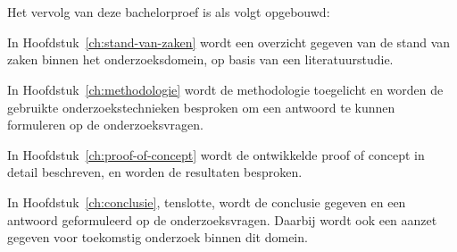 \section{}%
\label{sec:opzet-bachelorproef}


Het vervolg van deze bachelorproef is als volgt opgebouwd:

In Hoofdstuk~\ref{ch:stand-van-zaken} wordt een overzicht gegeven van de stand van zaken binnen het onderzoeksdomein, op basis van een literatuurstudie.

In Hoofdstuk~\ref{ch:methodologie} wordt de methodologie toegelicht en worden de gebruikte onderzoekstechnieken besproken om een antwoord te kunnen formuleren op de onderzoeksvragen.

In Hoofdstuk~\ref{ch:proof-of-concept} wordt de ontwikkelde proof of concept in detail beschreven, en worden de resultaten besproken.

In Hoofdstuk~\ref{ch:conclusie}, tenslotte, wordt de conclusie gegeven en een antwoord geformuleerd op de onderzoeksvragen. Daarbij wordt ook een aanzet gegeven voor toekomstig onderzoek binnen dit domein.